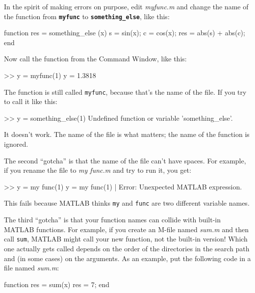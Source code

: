 
In the spirit of making errors on purpose, edit \emph{myfunc.m} and change the name of the function from \textbf{\lstinline{myfunc}} to \textbf{\lstinline{something_else}}, like this:

\begin{code}
function res = something_else (x)
    s = sin(x);
    c = cos(x);
    res = abs(s) + abs(c);
end
\end{code}

Now call the function from the Command Window, like this:

\begin{code}
>> y = myfunc(1)
y = 1.3818
\end{code}

The function is still called \lstinline{myfunc}, because that's the name of the file.
If you try to call it like this:

\begin{code}
>> y = something_else(1)
Undefined function or variable 'something_else'.
\end{code}

It doesn't work.  The name of the file is what matters; the name of the function is ignored.

The second ``gotcha'' is that the name of the file can't have spaces.
For example, if you rename the file to \emph{my func.m}
and try to run it, you get:

\begin{code}
>> y = my func(1)
 y = my func(1)
        |
Error: Unexpected MATLAB expression.
\end{code}

This fails because MATLAB thinks \lstinline{my} and \lstinline{func} are two different
variable names.

The third ``gotcha'' is that your function names can collide with built-in
MATLAB functions.  For example, if you create an M-file named \emph{sum.m} and then call \lstinline{sum}, MATLAB might call your new
function, not the built-in version!  Which one actually gets called
depends on the order of the directories in the search path and
(in some cases) on the arguments.  As an example, put the following
code in a file named \emph{sum.m}:


\begin{code}
function res = sum(x)
   res = 7;
end
\end{code}

